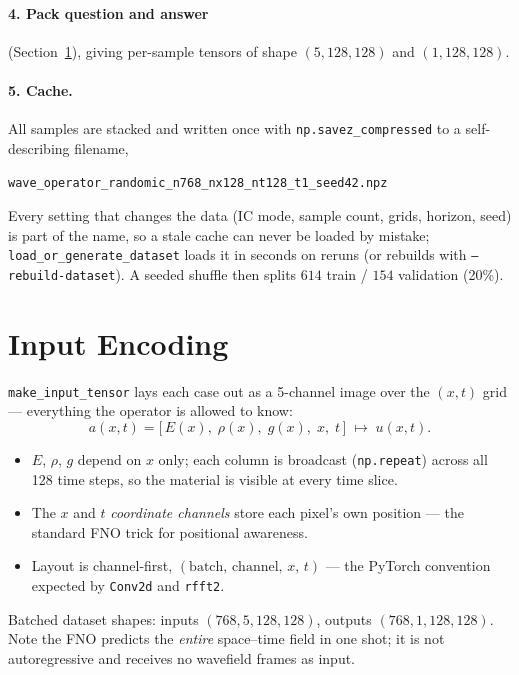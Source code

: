 \documentclass[11pt,a4paper]{article}
\begin{document}
\paragraph{4. Pack question and answer} (Section~\ref{sec:encoding}), giving
per-sample tensors of shape $(5, 128, 128)$ and $(1, 128, 128)$.

\paragraph{5. Cache.} All samples are stacked and written once with
\texttt{np.savez\_compressed} to a self-describing filename,
\begin{center}
\texttt{wave\_operator\_randomic\_n768\_nx128\_nt128\_t1\_seed42.npz}
\end{center}
Every setting that changes the data (IC mode, sample count, grids, horizon,
seed) is part of the name, so a stale cache can never be loaded by mistake;
\texttt{load\_or\_generate\_dataset} loads it in seconds on reruns (or rebuilds
with \texttt{--rebuild-dataset}). A seeded shuffle then splits
$614$ train / $154$ validation (20\%).

\section{Input Encoding}
\label{sec:encoding}

\texttt{make\_input\_tensor} lays each case out as a 5-channel image over the
$(x,t)$ grid --- everything the operator is allowed to know:
\begin{equation}
  a(x,t) = \bigl[\, E(x),\; \rho(x),\; g(x),\; x,\; t \,\bigr]
  \;\longmapsto\; u(x,t).
\end{equation}
\begin{itemize}[nosep]
  \item $E$, $\rho$, $g$ depend on $x$ only; each column is broadcast
        (\texttt{np.repeat}) across all 128 time steps, so the material is
        visible at every time slice.
  \item The $x$ and $t$ \emph{coordinate channels} store each pixel's own
        position --- the standard FNO trick for positional awareness.
  \item Layout is channel-first, $(\text{batch},\, \text{channel},\, x,\, t)$
        --- the PyTorch convention expected by \texttt{Conv2d} and \texttt{rfft2}.
\end{itemize}
Batched dataset shapes: inputs $(768, 5, 128, 128)$, outputs $(768, 1, 128, 128)$.
Note the FNO predicts the \emph{entire} space--time field in one shot; it is not
autoregressive and receives no wavefield frames as input.
\end{document}
